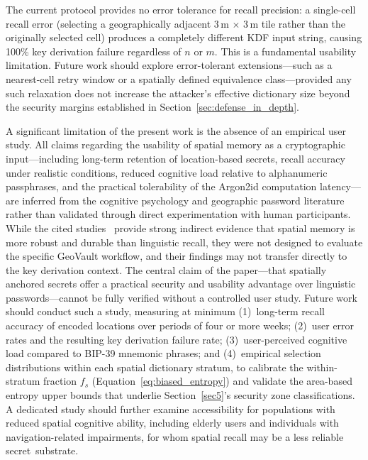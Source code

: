 \documentclass[mathematics,article,accept,pdftex,moreauthors]{Definitions/mdpi}
\begin{document}
{The current protocol provides no error tolerance for recall precision: a single-cell recall error (selecting a geographically adjacent 3\,m $\times$ 3\,m tile rather than the originally selected cell) produces a completely different KDF input string, causing 100\% key derivation failure regardless of $n$ or $m$. This is a fundamental usability limitation. Future work should explore error-tolerant extensions---such as a nearest-cell retry window or a spatially defined equivalence class---provided any such relaxation does not increase the attacker's effective dictionary size beyond the security margins established in Section~\ref{sec:defense_in_depth}.}

{A significant limitation of the present work is the absence of an empirical user study. All claims regarding the usability of spatial memory as a cryptographic input---including long-term retention of location-based secrets, recall accuracy under realistic conditions, reduced cognitive load relative to alphanumeric passphrases, and the practical tolerability of the Argon2id computation latency---are inferred from the cognitive psychology and geographic password literature rather than validated through direct experimentation with human participants. While the cited studies~\cite{montello1998new, McNamara2003, Konkle2010, Lukavsky2017, Thorpe2013, MacRae2016} provide strong indirect evidence that spatial memory is more robust and durable than linguistic recall, they were not designed to evaluate the specific GeoVault workflow, and their findings may not transfer directly to the key derivation context. The central claim of the paper---that spatially anchored secrets offer a practical security and usability advantage over linguistic passwords---cannot be fully verified without a controlled user study. Future work should conduct such a study, measuring at minimum (1)~long-term recall accuracy of encoded locations over periods of four or more weeks; (2)~user error rates and the resulting key derivation failure rate; (3)~user-perceived cognitive load compared to BIP-39 mnemonic phrases; and (4)~empirical selection distributions within each spatial dictionary stratum, to calibrate the within-stratum fraction $f_s$ (Equation~\eqref{eq:biased_entropy}) and validate the area-based entropy upper bounds that underlie Section~\ref{sec5}'s security zone classifications. {A dedicated study should further examine accessibility for populations with reduced spatial cognitive ability, including elderly users and individuals with navigation-related impairments, for whom spatial recall may be a less reliable secret~substrate.}}
\end{document}
